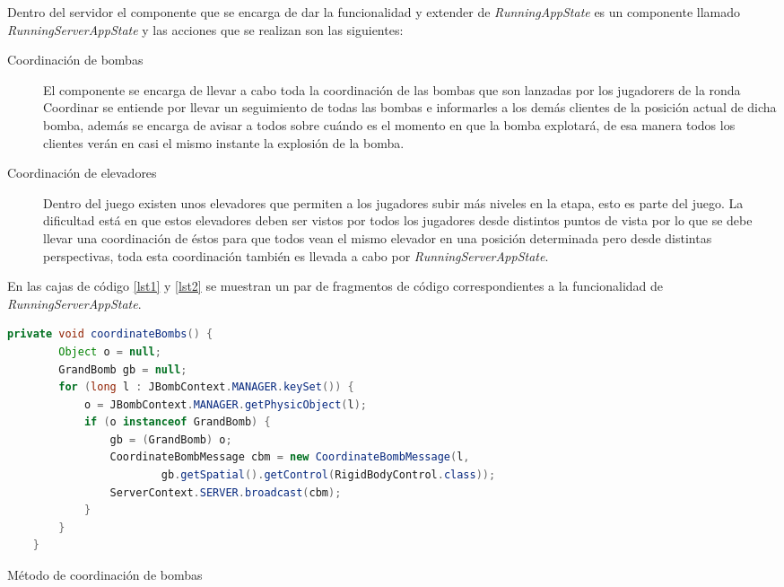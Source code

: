 \documentclass[a4paper,12pt,openany,oneside]{book}
\begin{document}
Dentro del servidor el componente que se encarga de dar la funcionalidad y extender de \textit{RunningAppState} es un componente llamado \textit{RunningServerAppState} y las acciones que se realizan son las siguientes:
\begin{description}
\item[Coordinación de bombas] El componente se encarga de llevar a cabo toda la coordinación de las bombas que son lanzadas por los jugadorers de la ronda Coordinar se entiende por llevar un seguimiento de todas las bombas e informarles a los demás clientes de la posición actual de dicha bomba, además se encarga de avisar a todos sobre cuándo es el momento en que la bomba explotará, de esa manera todos los clientes verán en casi el mismo instante la explosión de la bomba.
\item[Coordinación de elevadores] Dentro del juego existen unos elevadores que permiten a los jugadores subir más niveles en la etapa, esto es parte del juego. La dificultad está en que estos elevadores deben ser vistos por todos los jugadores desde distintos puntos de vista por lo que se debe llevar una coordinación de éstos para que todos vean el mismo elevador en una posición determinada pero desde distintas perspectivas, toda esta coordinación también es llevada a cabo por \textit{RunningServerAppState}.
\end{description}
En las cajas de código \ref{lst1} y \ref{lst2} se muestran un par de fragmentos de código correspondientes a la funcionalidad de \textit{RunningServerAppState}.
\begin{codigo}
\begin{lstlisting}[language=Java,frame=single,basicstyle=\scriptsize]
private void coordinateBombs() {
        Object o = null;
        GrandBomb gb = null;
        for (long l : JBombContext.MANAGER.keySet()) {
            o = JBombContext.MANAGER.getPhysicObject(l);
            if (o instanceof GrandBomb) {
                gb = (GrandBomb) o;
                CoordinateBombMessage cbm = new CoordinateBombMessage(l,
                        gb.getSpatial().getControl(RigidBodyControl.class));
                ServerContext.SERVER.broadcast(cbm);
            }
        }
    }
\end{lstlisting}
\caption{Método de coordinación de bombas}
\label{lst1}
\end{codigo}
\newpage
\end{document}
